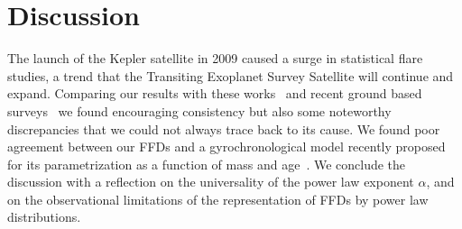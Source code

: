 \documentclass{aa}
\begin{document}
\section{Discussion}
\label{sec:discussion}
The launch of the Kepler satellite in 2009 caused a surge in statistical flare studies, a trend that the Transiting Exoplanet Survey Satellite will continue and expand. Comparing our results with these works~\citep{shibayama2013,lurie2015,lin2019,raetz2020} and recent ground based surveys~\citep{chang2015,howard2019} we found encouraging consistency but also some noteworthy discrepancies that we could not always trace back to its cause. We found poor agreement between our FFDs and a gyrochronological model recently proposed for its parametrization as a function of mass and age~\citep{davenport2019}. We conclude the discussion with a reflection on the universality of the power law exponent $\alpha$, and on the observational limitations of the representation of FFDs by power law distributions.
\end{document}
